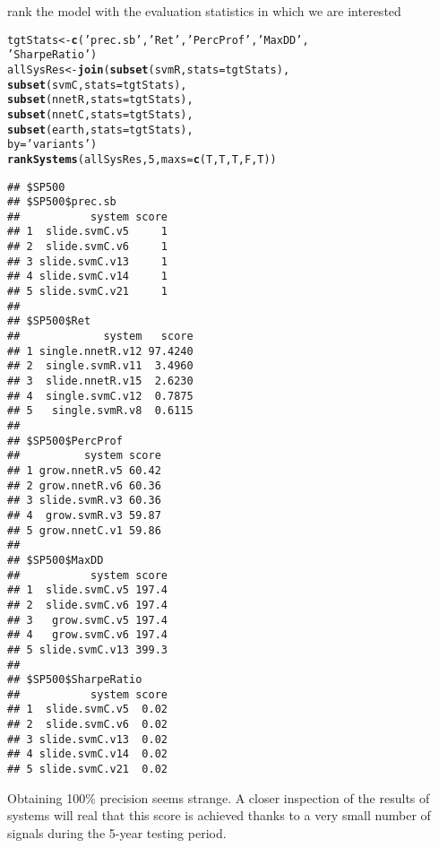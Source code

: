\documentclass{article}\usepackage[]{graphicx}\usepackage[]{color}
\makeatletter
\newcommand{\hlnum}[1]{\textcolor[rgb]{0.686,0.059,0.569}{#1}}%
\newcommand{\hlstr}[1]{\textcolor[rgb]{0.192,0.494,0.8}{#1}}%
\newcommand{\hlstd}[1]{\textcolor[rgb]{0.345,0.345,0.345}{#1}}%
\newcommand{\hlkwb}[1]{\textcolor[rgb]{0.69,0.353,0.396}{#1}}%
\newcommand{\hlkwc}[1]{\textcolor[rgb]{0.333,0.667,0.333}{#1}}%
\newcommand{\hlkwd}[1]{\textcolor[rgb]{0.737,0.353,0.396}{\textbf{#1}}}%
\newenvironment{kframe}{%
 \def\at@end@of@kframe{}%
 \ifinner\ifhmode%
  \def\at@end@of@kframe{\end{minipage}}%
  \begin{minipage}{\columnwidth}%
 \fi\fi%
 \def\FrameCommand##1{\hskip\@totalleftmargin \hskip-\fboxsep
 \colorbox{shadecolor}{##1}\hskip-\fboxsep
     \hskip-\linewidth \hskip-\@totalleftmargin \hskip\columnwidth}%
 \MakeFramed {\advance\hsize-\width
   \@totalleftmargin\z@ \linewidth\hsize
   \@setminipage}}%
 {\par\unskip\endMakeFramed%
 \at@end@of@kframe}
\newenvironment{knitrout}{}{} %
\makeatother
\begin{document}
rank the model with the evaluation statistics in which we are interested
\begin{knitrout}
\color{fgcolor}\begin{kframe}
\begin{alltt}
\hlstd{tgtStats} \hlkwb{<-} \hlkwd{c}\hlstd{(}\hlstr{'prec.sb'}\hlstd{,} \hlstr{'Ret'}\hlstd{,} \hlstr{'PercProf'}\hlstd{,} \hlstr{'MaxDD'}\hlstd{,}
              \hlstr{'SharpeRatio'}\hlstd{)}
\hlstd{allSysRes} \hlkwb{<-} \hlkwd{join}\hlstd{(}\hlkwd{subset}\hlstd{(svmR,} \hlkwc{stats} \hlstd{= tgtStats),}
            \hlkwd{subset}\hlstd{(svmC,} \hlkwc{stats} \hlstd{= tgtStats),}
            \hlkwd{subset}\hlstd{(nnetR,} \hlkwc{stats} \hlstd{= tgtStats),}
            \hlkwd{subset}\hlstd{(nnetC,} \hlkwc{stats} \hlstd{= tgtStats),}
            \hlkwd{subset}\hlstd{(earth,} \hlkwc{stats} \hlstd{= tgtStats),}
            \hlkwc{by} \hlstd{=} \hlstr{'variants'}\hlstd{)}
\hlkwd{rankSystems}\hlstd{(allSysRes,} \hlnum{5}\hlstd{,} \hlkwc{maxs} \hlstd{=} \hlkwd{c}\hlstd{(T, T, T, F, T))}
\end{alltt}
\begin{verbatim}
## $SP500
## $SP500$prec.sb
##           system score
## 1  slide.svmC.v5     1
## 2  slide.svmC.v6     1
## 3 slide.svmC.v13     1
## 4 slide.svmC.v14     1
## 5 slide.svmC.v21     1
## 
## $SP500$Ret
##             system   score
## 1 single.nnetR.v12 97.4240
## 2  single.svmR.v11  3.4960
## 3  slide.nnetR.v15  2.6230
## 4  single.svmC.v12  0.7875
## 5   single.svmR.v8  0.6115
## 
## $SP500$PercProf
##          system score
## 1 grow.nnetR.v5 60.42
## 2 grow.nnetR.v6 60.36
## 3 slide.svmR.v3 60.36
## 4  grow.svmR.v3 59.87
## 5 grow.nnetC.v1 59.86
## 
## $SP500$MaxDD
##           system score
## 1  slide.svmC.v5 197.4
## 2  slide.svmC.v6 197.4
## 3   grow.svmC.v5 197.4
## 4   grow.svmC.v6 197.4
## 5 slide.svmC.v13 399.3
## 
## $SP500$SharpeRatio
##           system score
## 1  slide.svmC.v5  0.02
## 2  slide.svmC.v6  0.02
## 3 slide.svmC.v13  0.02
## 4 slide.svmC.v14  0.02
## 5 slide.svmC.v21  0.02
\end{verbatim}
\end{kframe}
\end{knitrout}
Obtaining 100\% precision seems strange. A closer inspection of the results of systems will real that this score is achieved thanks to a very small number of signals during the 5-year testing period.
\end{document}
